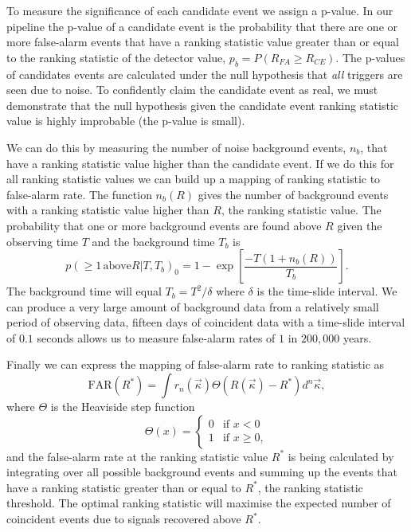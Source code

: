 To measure the significance of each candidate event we assign a p-value. In our pipeline the p-value of a candidate event is the probability that there are one or more false-alarm events that have a ranking statistic value greater than or equal to the ranking statistic of the detector value, $p_{b} = P(R_{FA} \ge R_{CE})$. The p-values of candidates events are calculated under the null hypothesis that \textit{all} triggers are seen due to noise. To confidently claim the candidate event as real, we must demonstrate that the null hypothesis given the candidate event ranking statistic value is highly improbable (the p-value is small).

We can do this by measuring the number of noise background events, $n_{b}$, that have a ranking statistic value higher than the candidate event. If we do this for all ranking statistic values we can build up a mapping of ranking statistic to false-alarm rate. The function $n_{b}(R)$ gives the number of background events with a ranking statistic value higher than $R$, the ranking statistic value. The probability that one or more background events are found above $R$ given the observing time $T$ and the background time $T_{b}$ is~\cite{PyCBC:2016}
%
\begin{equation}
    p(\ge 1 \, \text{above} R|T, T_{b})_{0} = 1 - \exp \left[\frac{-T(1 + n_{b}(R))}{T_{b}}\right].
\end{equation}
%
The background time will equal $T_{b} = T^{2}/\delta$ where $\delta$ is the time-slide interval. We can produce a very large amount of background data from a relatively small period of observing data, fifteen days of coincident data with a time-slide interval of $0.1$ seconds allows us to measure false-alarm rates of $1$ in $200,000$ years.

Finally we can express the mapping of false-alarm rate to ranking statistic as
%
\begin{equation}
    \text{FAR}(R^{*}) = \int r_{n}(\vec{\kappa}) \Theta(R(\vec{\kappa}) - R^{*}) d^{n}\vec{\kappa},
    \label{2:eq:far_mapping}
\end{equation}
%
where $\Theta$ is the Heaviside step function
%
\begin{equation}
    \Theta(x) =
    \begin{cases} 
        0 & \text{if } x < 0 \\
        1 & \text{if } x \geq 0,
    \end{cases}
\end{equation}
%
and the false-alarm rate at the ranking statistic value $R^{*}$ is being calculated by integrating over all possible background events and summing up the events that have a ranking statistic greater than or equal to $R^{*}$, the ranking statistic threshold. The optimal ranking statistic will maximise the expected number of coincident events due to signals recovered above $R^{*}$.

